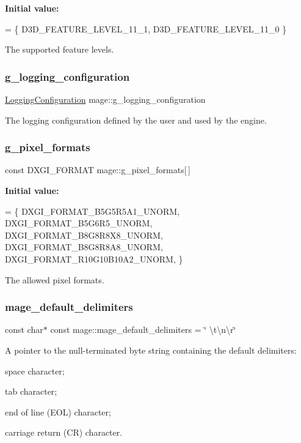 {\bfseries Initial value\+:}
\begin{DoxyCode}
= \{
        D3D\_FEATURE\_LEVEL\_11\_1,
        D3D\_FEATURE\_LEVEL\_11\_0
    \}
\end{DoxyCode}
The supported feature levels. \hypertarget{namespacemage_a162413669f92d91c7ee135d60f93fcf1}{}\label{namespacemage_a162413669f92d91c7ee135d60f93fcf1} 
\subsubsection{\texorpdfstring{g\+\_\+logging\+\_\+configuration}{g\_logging\_configuration}}
{\footnotesize\ttfamily \hyperlink{structmage_1_1_logging_configuration}{Logging\+Configuration} mage\+::g\+\_\+logging\+\_\+configuration}

The logging configuration defined by the user and used by the engine. \hypertarget{namespacemage_a5a4e11b65061c618b85826ab6df480e0}{}\label{namespacemage_a5a4e11b65061c618b85826ab6df480e0} 
\subsubsection{\texorpdfstring{g\+\_\+pixel\+\_\+formats}{g\_pixel\_formats}}
{\footnotesize\ttfamily const D\+X\+G\+I\+\_\+\+F\+O\+R\+M\+AT mage\+::g\+\_\+pixel\+\_\+formats\mbox{[}$\,$\mbox{]}}

{\bfseries Initial value\+:}
\begin{DoxyCode}
= \{
        DXGI\_FORMAT\_B5G5R5A1\_UNORM,    
        DXGI\_FORMAT\_B5G6R5\_UNORM,      
        DXGI\_FORMAT\_B8G8R8X8\_UNORM,    
        DXGI\_FORMAT\_B8G8R8A8\_UNORM,    
        DXGI\_FORMAT\_R10G10B10A2\_UNORM, 
    \}
\end{DoxyCode}
The allowed pixel formats. \hypertarget{namespacemage_ae247ad66af37a4b0d67ddca9404ca01a}{}\label{namespacemage_ae247ad66af37a4b0d67ddca9404ca01a} 
\subsubsection{\texorpdfstring{mage\+\_\+default\+\_\+delimiters}{mage\_default\_delimiters}}
{\footnotesize\ttfamily const char$\ast$ const mage\+::mage\+\_\+default\+\_\+delimiters = \char`\"{} \textbackslash{}t\textbackslash{}n\textbackslash{}r\char`\"{}}

A pointer to the null-\/terminated byte string containing the default delimiters\+:
\begin{DoxyEnumerate}
\item space character;
\item tab character;
\item end of line (E\+OL) character;
\item carriage return (CR) character. 
\end{DoxyEnumerate}